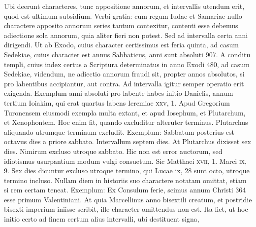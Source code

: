 Ubi deerunt characteres,
tunc appositione annorum, et intervallis utendum erit, quod est ultimum
subsidium.
Verbi gratia: cum regum Iudae et Samariae nullo
charactere apposito annorum series tantum contexitur, contenti esse
debemus adiectione sola annorum, quia aliter fieri non potest.
Sed
ad intervalla certa anni dirigendi.
Ut ab Exodo, cuius character certissimus
est feria quinta, ad casum Sedekiae, cuius character est annus
Sabbaticus, anni sunt absoluti 907.
A conditu templi, cuius index certus
a Scriptura determinatus in anno Exodi 480, ad casum Sedekiae,
videndum, ne adiectio annorum fraudi sit, propter annos absolutos,
si pro labentibus accipiantur, aut contra.
Ad intervalla igitur
semper operatio erit exigenda.
Exemplum anni absoluti pro labente
habes initio Danielis, annum tertium Ioiakim, qui erat quartus labens
Ieremiae \textsc{xxv}, 1.
Apud Gregorium Turonensem eiusmodi
exempla multa extant, et apud Iosephum, et Plutarchum, et
Xenophontem.
Hoc enim fit, quando excluditur alteruter terminus.
Plutarchus aliquando utrumque terminum excludit.
Exemplum: Sabbatum
posterius est octavus dies a priore sabbato.
Intervallum septem
dies.
At Plutarchus dixisset sex dies.
Nimirum excluso utroque
sabbato.
Hic non est error auctorum, sed idiotismus usurpantium
modum vulgi consuetum.
Sic Matthaei \textsc{xvii}, 1.
 Marci \textsc{ix}, 9.
Sex
dies dicuntur excluso utroque termino, qui Lucae {ix}, 28
 sunt octo,
utroque termino incluso.
Nullam diem in historiis suo charactere
notatam omittat, etiam si rem certam teneat.
Exemplum: Ex Consulum
ferie, scimus annum Christi 364 esse primum Valentiniani.
At quia Marcellinus anno bisextili creatum,
 et postridie bisexti imperium
iniisse scribit, ille character omittendus non est.
Ita fiet, ut
hoc initio certo ad finem certum alius intervalli, ubi destituent signa,
